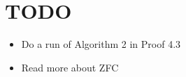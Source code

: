 \section{TODO}\par
\begin{itemize}
  \item Do a run of Algorithm 2 in Proof 4.3
  \item Read more about ZFC
\end{itemize}
